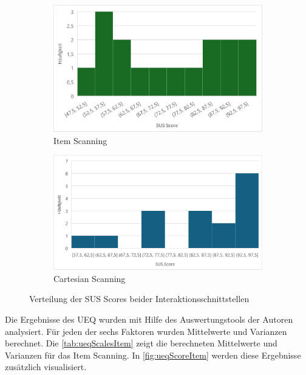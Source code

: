 \begin{figure}
    \centering
    \begin{subfigure} {.5\textwidth}
        \centering
        \includegraphics[width=.95\linewidth]{images/Results/Histogramm-SUS-Item.png}
        \caption{Item Scanning}
        \label{fig:histoSUSItem}
       \end{subfigure}%
       \begin{subfigure}{.5\textwidth}
        \centering
       \includegraphics[width=.98\linewidth]{images/Results/Histogramm-SUS-Cartesian.png}
        \caption{Cartesian Scanning}
        \label{fig:histoSUSCartesian}
       \end{subfigure}
       \caption{Verteilung der SUS Scores beider Interaktionsschnittstellen}
       \label{fig:histoSUS}
\end{figure}


Die Ergebnisse des UEQ wurden mit Hilfe des Auswertungstools der Autoren analysiert. Für jeden der sechs Faktoren wurden Mittelwerte und Varianzen berechnet. Die \autoref{tab:ueqScalesItem} zeigt die berechneten Mittelwerte und Varianzen für das Item Scanning. In \autoref{fig:ueqScoreItem} werden diese Ergebnisse zusätzlich visualisiert. 

